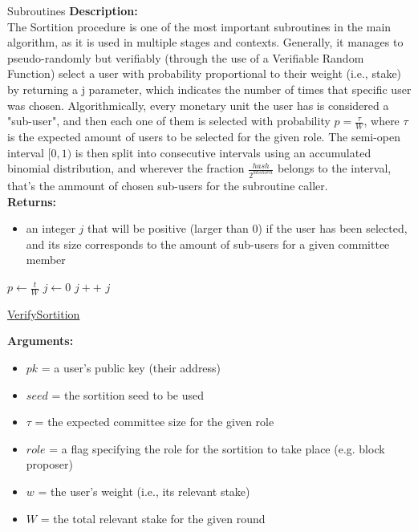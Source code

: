 \documentclass[10pt,a4paper]{article}
\begin{document}
\begin{section}{Subroutines}
\noindent \textbf{Description:}\\
The Sortition procedure is one of the most important subroutines in the main algorithm, as it is 
used in multiple stages and contexts.
Generally, it manages to pseudo-randomly but verifiably (through the use of a Verifiable Random 
Function) select a user with probability proportional
to their weight (i.e., stake) by returning a j parameter, which indicates the number of times that 
specific user was chosen.
Algorithmically, every monetary unit the user has is considered a "sub-user", and then each one 
of them is selected with probability $p = \frac{\tau}{W}$,
where $\tau$ is the expected amount of users to be selected for the given role.
The semi-open interval $[0,1)$ is then split into consecutive intervals using an accumulated 
binomial distribution, and wherever the fraction $\frac{hash}{2^{hashlen}}$
belongs to the interval, that's the ammount of chosen sub-users for the subroutine caller.\\

\noindent \textbf{Returns:}
\begin{itemize}
    \item an integer $j$ that will be positive (larger than 0) if the user has been selected, 
    and its size corresponds to the amount of sub-users for a given committee member
  \end{itemize}



\begin{algorithm}[H]
    \begin{algorithmic}[1]
        \State $p \gets \frac{t}{W}$
        \State $j \gets 0$
        \While{$\frac{hash}{2^{hashlen}} \notin [\sum_{k=0}^j\mathsf{B}(k;w,p), \sum_{k=0}^{j+1}\mathsf{B}(k;w,p))$}
            \State $j++$
        \EndWhile
        \Return $j$
    \EndFunction
    \end{algorithmic}
    \caption{\underline{VerifySortition}}
\end{algorithm}

\noindent \textbf{Arguments:}
\begin{itemize}
    \item $pk$ = a user's public key (their address)
    \item $seed$ = the sortition seed to be used
    \item $\tau$ = the expected committee size for the given role
    \item $role$ = a flag specifying the role for the sortition to take place (e.g. block proposer)
    \item $w$ = the user's weight (i.e., its relevant stake)
    \item $W$ = the total relevant stake for the given round
  \end{itemize}


\end{section}
\end{document}
